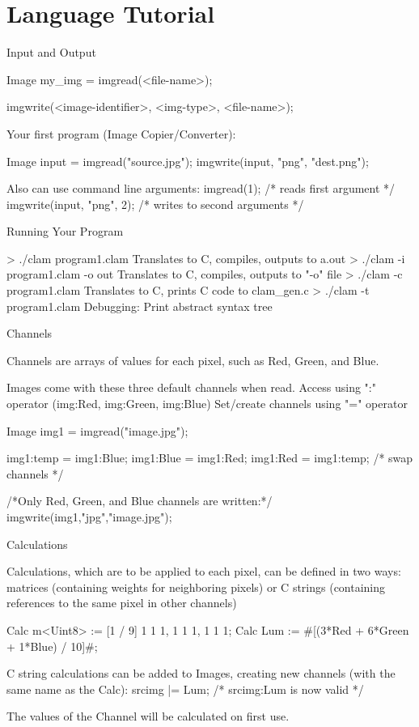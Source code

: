 \chapter{Language Tutorial}

Input and Output

Image my_img = imgread(<file-name>);

imgwrite(<image-identifier>, <img-type>, <file-name>);

Your first program (Image Copier/Converter):

Image input = imgread("source.jpg");
imgwrite(input, "png", "dest.png");

Also can use command line arguments:
imgread(1); /* reads first  argument */
imgwrite(input, "png", 2); /* writes to second arguments */

Running Your Program

> ./clam program1.clam
Translates to C, compiles, outputs to a.out
> ./clam -i program1.clam -o out
Translates to C, compiles, outputs to "-o" file
> ./clam -c program1.clam
Translates to C, prints C code to clam_gen.c
> ./clam -t program1.clam
Debugging: Print abstract syntax tree

Channels

Channels are arrays of values for each pixel, such as Red, Green, and Blue.

Images come with these three default channels when read.
Access using ":" operator (img:Red, img:Green, img:Blue)
Set/create channels using "=" operator

Image img1 = imgread("image.jpg");

img1:temp = img1:Blue;
img1:Blue = img1:Red;
img1:Red = img1:temp; /* swap channels */

/*Only Red, Green, and Blue channels are written:*/
imgwrite(img1,"jpg","image.jpg");

Calculations

Calculations, which are to be applied to each pixel,
can be defined in two ways: 
    matrices (containing weights for neighboring pixels)
    or C strings (containing references to the same pixel in other channels)

Calc m<Uint8> := [1 / 9] {1 1 1, 1 1 1, 1 1 1};
Calc Lum := #[(3*Red + 6*Green + 1*Blue) / 10]#;

C string calculations can be added to Images,
creating new channels (with the same name as the Calc):
srcimg |= Lum; /* srcimg:Lum is now valid */

The values of the Channel will be calculated on first use.

